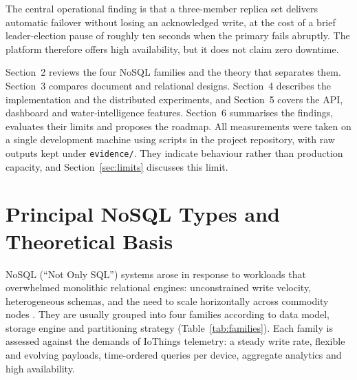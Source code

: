 \documentclass[11pt,a4paper]{article}
\begin{document}
The central operational finding is that a three-member replica set delivers automatic failover without losing an acknowledged write, at the cost of a brief leader-election pause of roughly ten seconds when the primary fails abruptly. The platform therefore offers high availability, but it does not claim zero downtime.

Section~2 reviews the four NoSQL families and the theory that separates them. Section~3 compares document and relational designs. Section~4 describes the implementation and the distributed experiments, and Section~5 covers the API, dashboard and water-intelligence features. Section~6 summarises the findings, evaluates their limits and proposes the roadmap. All measurements were taken on a single development machine using scripts in the project repository, with raw outputs kept under \texttt{evidence/}. They indicate behaviour rather than production capacity, and Section~\ref{sec:limits} discusses this limit.

\section{Principal NoSQL Types and Theoretical Basis}

NoSQL (``Not Only SQL'') systems arose in response to workloads that overwhelmed monolithic relational engines: unconstrained write velocity, heterogeneous schemas, and the need to scale horizontally across commodity nodes \citep{cattell2011,sadalage2012}. They are usually grouped into four families according to data model, storage engine and partitioning strategy (Table~\ref{tab:families}). Each family is assessed against the demands of IoThings telemetry: a steady write rate, flexible and evolving payloads, time-ordered queries per device, aggregate analytics and high availability.
\end{document}
